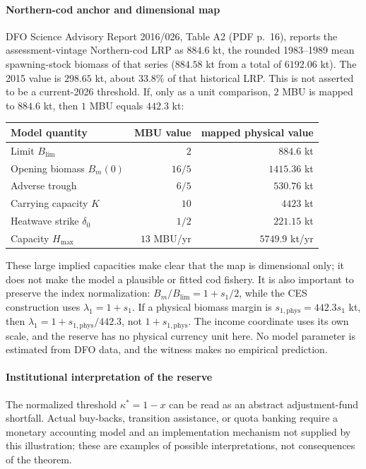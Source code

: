 \documentclass[preprint,11pt,authoryear]{elsarticle}
\theoremstyle{remark}
\begin{document}
\paragraph{Northern-cod anchor and dimensional map} DFO Science Advisory Report 2016/026, Table A2 (PDF p.~16), reports the assessment-vintage Northern-cod LRP as $884.6$ kt, the rounded 1983--1989 mean spawning-stock biomass of that series ($884.58$ kt from a total of $6192.06$ kt). The 2015 value is $298.65$ kt, about $33.8\%$ of that historical LRP. This is not asserted to be a current-2026 threshold. If, only as a unit comparison, $2$ MBU is mapped to $884.6$ kt, then $1$ MBU equals $442.3$ kt:
\begin{center}\small
\begin{tabular}{@{}lrr@{}}\toprule
Model quantity & MBU value & mapped physical value \\
\midrule
Limit $B_{\mathrm{lim}}$ & $2$ & $884.6$ kt \\
Opening biomass $B_m(0)$ & $16/5$ & $1415.36$ kt \\
Adverse trough & $6/5$ & $530.76$ kt \\
Carrying capacity $K$ & $10$ & $4423$ kt \\
Heatwave strike $\delta_0$ & $1/2$ & $221.15$ kt \\
Capacity $H_{\max}$ & $13$ MBU/yr & $5749.9$ kt/yr \\
\bottomrule\end{tabular}
\end{center}
These large implied capacities make clear that the map is dimensional only; it does not make the model a plausible or fitted cod fishery. It is also important to preserve the index normalization: $B_m/B_{\mathrm{lim}}=1+s_1/2$, while the CES construction uses $\lambda_1=1+s_1$. If a physical biomass margin is $s_{1,\mathrm{phys}}=442.3s_1$ kt, then $\lambda_1=1+s_{1,\mathrm{phys}}/442.3$, not $1+s_{1,\mathrm{phys}}$. The income coordinate uses its own scale, and the reserve has no physical currency unit here. No model parameter is estimated from DFO data, and the witness makes no empirical prediction.

\paragraph{Institutional interpretation of the reserve} The normalized threshold $\kappa^*=1-x$ can be read as an abstract adjustment-fund shortfall. Actual buy-backs, transition assistance, or quota banking require a monetary accounting model and an implementation mechanism not supplied by this illustration; these are examples of possible interpretations, not consequences of the theorem.
\end{document}
